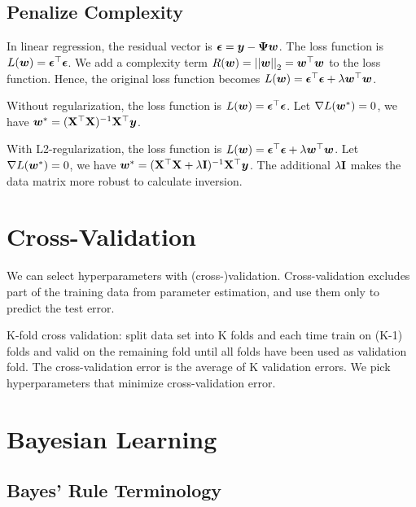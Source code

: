 \subsection{Penalize Complexity}

In linear regression, the residual vector is $\boldsymbol{\epsilon}=\boldsymbol{y}-\boldsymbol{\Psi}\boldsymbol{w}$. The loss function is $L(\boldsymbol{w})=\boldsymbol{\epsilon}{}^\top\boldsymbol{\epsilon}$. We add a complexity term $R(\boldsymbol{w})=\left\vert\left\vert \boldsymbol{w} \right\vert\right\vert_2=\boldsymbol{w}{}^\top\boldsymbol{w}$ to the loss function. Hence, the original loss function becomes $L(\boldsymbol{w})=\boldsymbol{\epsilon}{}^\top\boldsymbol{\epsilon}+\lambda\boldsymbol{w}{}^\top\boldsymbol{w}$.

Without regularization, the loss function is $L(\boldsymbol{w})=\boldsymbol{\epsilon}{}^\top\boldsymbol{\epsilon}$. Let $\nabla L(\boldsymbol{w}^*)=0$, we have $\boldsymbol{w}^*=(\mathbf{X}{}^\top\mathbf{X})^{-1}\mathbf{X}{}^\top\boldsymbol{y}$.

With L2-regularization, the loss function is $L(\boldsymbol{w})=\boldsymbol{\epsilon}{}^\top\boldsymbol{\epsilon}+\lambda\boldsymbol{w}{}^\top\boldsymbol{w}$. Let $\nabla L(\boldsymbol{w}^*)=0$, we have $\boldsymbol{w}^*=(\mathbf{X}{}^\top\mathbf{X}+\lambda\mathbf{I})^{-1}\mathbf{X}{}^\top\boldsymbol{y}$. The additional $\lambda\mathbf{I}$ makes the data matrix more robust to calculate inversion.

\section{Cross-Validation}
\label{section3.2}

We can select hyperparameters with (cross-)validation. Cross-validation excludes part of the training data from parameter estimation, and use them only to predict the test error.

K-fold cross validation: split data set into K folds and each time train on (K-1) folds and valid on the remaining fold until all folds have been used as validation fold. The cross-validation error is the average of K validation errors. We pick hyperparameters that minimize cross-validation error.

\section{Bayesian Learning}
\label{section3.3}

\subsection{Bayes' Rule Terminology}

